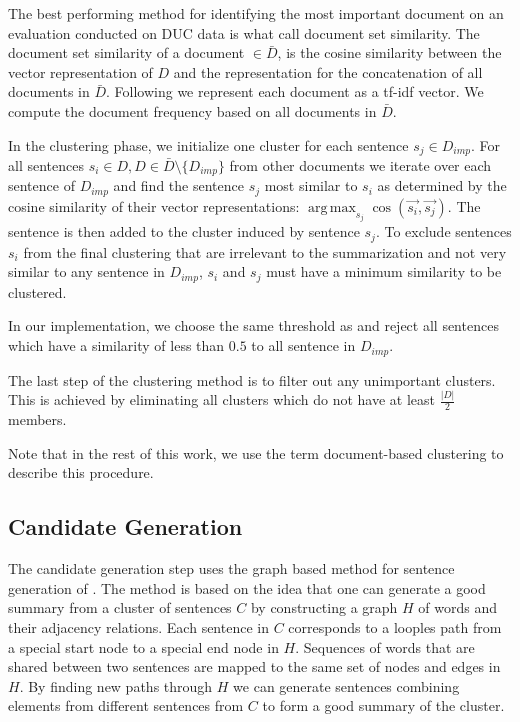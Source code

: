 \documentclass[a4paper,BCOR=10mm]{report}
\DeclareMathOperator*{\argmax}{arg\,max}
\numberwithin{lemma}{chapter}
\numberwithin{definition}{chapter}
\begin{document}
The best performing method for identifying the most important document on an evaluation conducted on DUC data is what \citeauthor{banerjee} call document set similarity.
The document set similarity of a document $ \in \bar{D}$, is the cosine similarity between the vector representation of $D$ and the representation for the concatenation of all documents in $\bar{D}$.
Following \citeauthor{banerjee} we represent each document as a tf-idf vector. We compute the document frequency based on all documents in $\bar{D}$.

In the clustering phase, we initialize one cluster for each sentence $s_j \in D_{imp}$. For all sentences $s_i \in D, D \in \bar{D} \setminus \{D_{imp}\}$ from other documents we iterate over each sentence of $D_{imp}$ and find the sentence $s_j$ most similar to $s_i$ as determined by the cosine similarity of their vector representations: $\argmax_{s_j} \cos(\vec{s_i}, \vec{s_j})$. The sentence is then added to the cluster induced by sentence $s_j$. To exclude sentences $s_i$ from the final clustering that are irrelevant to the summarization and not very similar to any sentence in $D_{imp}$, $s_i$ and $s_j$ must have a minimum similarity to be clustered.

In our implementation, we choose the same threshold as \citeauthor{banerjee} and reject all sentences which have a similarity of less than $0.5$ to all sentence in $D_{imp}$.

The last step of the clustering method is to filter out any unimportant clusters. This is achieved by eliminating all clusters which do not have at least $\frac{|D|}{2}$ members.

Note that in the rest of this work, we use the term document-based clustering to describe this procedure.


\subsection{Candidate Generation} \label{sec:baseline-generation}

The candidate generation step uses the graph based method for sentence generation of \citet{filippova}. The method is based on the idea that one can generate a good summary from a cluster of sentences $C$ by constructing a graph $H$ of words and their adjacency relations. Each sentence in $C$ corresponds to a looples path from a special start node to a special end node in $H$. Sequences of words that are shared between two sentences are mapped to the same set of nodes and edges in $H$. By finding new paths through $H$ we can generate sentences combining elements from different sentences from $C$ to form a good summary of the cluster.
\end{document}
